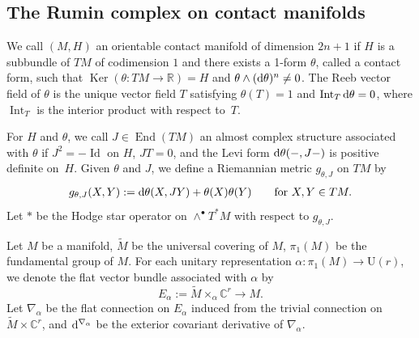 \documentclass[10pt,a4paper]{amsart}
\numberwithin{equation}{section}
\DeclareMathOperator{\End}{End}
\DeclareMathOperator{\Int}{Int}
\DeclareMathOperator{\Ker}{Ker}
\DeclareMathOperator{\Id}{Id}
\newcommand{\bR}{\mathbb{R}}
\newcommand{\bC}{\mathbb{C}}
\begin{document}
\subsection{The Rumin complex on contact manifolds}
\label{sec: The Rumin complex on contact manifolds}

We call $(M,H)$ an orientable contact manifold of dimension $2n+1$
if $H$ is a subbundle of $TM$ of codimension $1$
and
there exists a 1-form $\theta$,
called a contact form,
such that
 ${\Ker (\theta \colon TM \! \to \! \bR ) = H}$
and $\theta \wedge ( {\rm d} \theta )^n \not = 0$.
The Reeb vector field of $\theta$ is the unique vector field $T$ satisfying $\theta (T) =1$ and $\Int_T {\rm d} \theta =0$, where $\Int_T$ is the interior product with respect to~$T$.

For $H$ and $\theta$,
we call $J \in \End (TM)$
an almost complex structure associated with $\theta$ if
$J^2 = - \Id $ on $H$, $JT=0$, and the Levi form ${\rm d} \theta ( - , J - )$ is positive definite on~$H$.
Given $\theta $ and $J$, we define a Riemannian metric $g_{\theta , J}$ on $TM$ by
\begin{align*}
g_{\theta , J} (X,Y) := {\rm d} \theta (X , JY) + \theta (X) \theta (Y) \qquad \text{for} \ X,Y \in TM .
\end{align*}
Let $*$ be the Hodge star operator on $\wedge^\bullet T^*M$ with respect to $g_{\theta , J}$.

Let $M$ be a manifold, $\widetilde M$ be the universal covering of $M$,
$\pi_1 (M)$ be the fundamental group of $M$.
For each unitary representation $\alpha \colon \pi_1 (M) \to \mathrm{U} (r )$,
we denote the flat vector bundle associated with $\alpha$ by
\[
 E_{\alpha} := \widetilde M \times_{\alpha} \bC^r \to M .
\]
Let $\nabla_{\alpha}$ be the flat connection on $E_{\alpha}$ induced from the trivial connection on $\widetilde M \times \bC^r$,
and ${\rm d}^{\nabla_{\alpha}}$ be the exterior covariant derivative of $\nabla_{\alpha}$.
\end{document}
